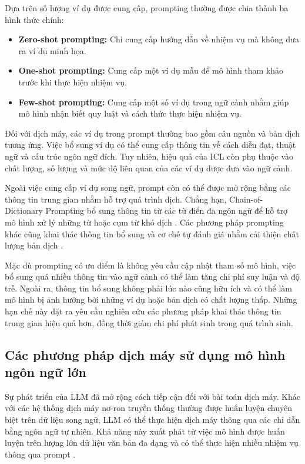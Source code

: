 Dựa trên số lượng ví dụ được cung cấp, prompting thường được chia thành ba hình thức chính:

\begin{itemize}
    \item \textbf{Zero-shot prompting:} Chỉ cung cấp hướng dẫn về nhiệm vụ mà không đưa ra ví dụ minh họa.
    \item \textbf{One-shot prompting:} Cung cấp một ví dụ mẫu để mô hình tham khảo trước khi thực hiện nhiệm vụ.
    \item \textbf{Few-shot prompting:} Cung cấp một số ví dụ trong ngữ cảnh nhằm giúp mô hình nhận biết quy luật và cách thức thực hiện nhiệm vụ.
\end{itemize}

Đối với dịch máy, các ví dụ trong prompt thường bao gồm câu nguồn và bản dịch tương ứng. Việc bổ sung ví dụ có thể cung cấp thông tin về cách diễn đạt, thuật ngữ và cấu trúc ngôn ngữ đích. Tuy nhiên, hiệu quả của ICL còn phụ thuộc vào chất lượng, số lượng và mức độ liên quan của các ví dụ được đưa vào ngữ cảnh.

Ngoài việc cung cấp ví dụ song ngữ, prompt còn có thể được mở rộng bằng các thông tin trung gian nhằm hỗ trợ quá trình dịch. Chẳng hạn, Chain-of-Dictionary Prompting bổ sung thông tin từ các từ điển đa ngôn ngữ để hỗ trợ mô hình xử lý những từ hoặc cụm từ khó dịch \cite{lu-etal-2024-chain}. Các phương pháp prompting khác cũng khai thác thông tin bổ sung và cơ chế tự đánh giá nhằm cải thiện chất lượng bản dịch \cite{feng-etal-2025-tear,he-etal-2024-exploring}.

Mặc dù prompting có ưu điểm là không yêu cầu cập nhật tham số mô hình, việc bổ sung quá nhiều thông tin vào ngữ cảnh có thể làm tăng chi phí suy luận và độ trễ. Ngoài ra, thông tin bổ sung không phải lúc nào cũng hữu ích và có thể làm mô hình bị ảnh hưởng bởi những ví dụ hoặc bản dịch có chất lượng thấp. Những hạn chế này đặt ra yêu cầu nghiên cứu các phương pháp khai thác thông tin trung gian hiệu quả hơn, đồng thời giảm chi phí phát sinh trong quá trình sinh.

\subsection{Các phương pháp dịch máy sử dụng mô hình ngôn ngữ lớn}

Sự phát triển của LLM đã mở rộng cách tiếp cận đối với bài toán dịch máy. Khác với các hệ thống dịch máy nơ-ron truyền thống thường được huấn luyện chuyên biệt trên dữ liệu song ngữ, LLM có thể thực hiện dịch máy thông qua các chỉ dẫn bằng ngôn ngữ tự nhiên. Khả năng này xuất phát từ việc mô hình được huấn luyện trên lượng lớn dữ liệu văn bản đa dạng và có thể thực hiện nhiều nhiệm vụ thông qua prompt \cite{info16090723}.

